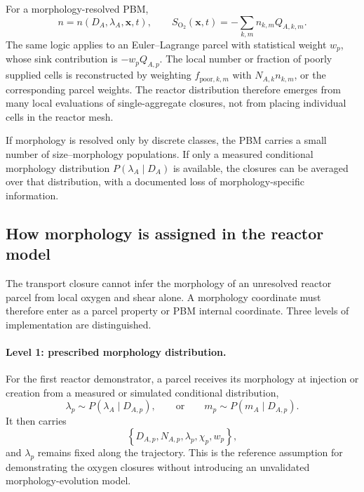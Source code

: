 \documentclass[11pt,a4paper]{article}
\newcommand{\Otwo}{\mathrm{O}_2}
\begin{document}
For a morphology-resolved PBM,
\begin{equation}
  n=n(D_A,\lambda_A,\boldsymbol{x},t),
  \qquad
  S_{\Otwo}(\boldsymbol{x},t)
  =-\sum_{k,m}n_{k,m}Q_{A,k,m}.
  \label{eq:pbm_sink}
\end{equation}
The same logic applies to an Euler--Lagrange parcel with statistical weight
\(w_p\), whose sink contribution is \(-w_pQ_{A,p}\). The local number or
fraction of poorly supplied cells is reconstructed by weighting
\(f_{\mathrm{poor},k,m}\) with \(N_{A,k}n_{k,m}\), or the corresponding parcel
weights. The reactor distribution therefore emerges from many local
evaluations of single-aggregate closures, not from placing individual cells in
the reactor mesh.

If morphology is resolved only by discrete classes, the PBM carries a small
number of size--morphology populations. If only a measured conditional
morphology distribution \(P(\lambda_A\mid D_A)\) is available, the closures can
be averaged over that distribution, with a documented loss of
morphology-specific information.

\subsection{How morphology is assigned in the reactor model}

The transport closure cannot infer the morphology of an unresolved reactor
parcel from local oxygen and shear alone. A morphology coordinate must
therefore enter as a parcel property or PBM internal coordinate. Three levels
of implementation are distinguished.

\paragraph{Level 1: prescribed morphology distribution.}
For the first reactor demonstrator, a parcel receives its morphology at
injection or creation from a measured or simulated conditional distribution,
\begin{equation}
  \lambda_p\sim P(\lambda_A\mid D_{A,p}),
  \qquad\text{or}\qquad
  m_p\sim P(m_A\mid D_{A,p}).
  \label{eq:morph_sampling}
\end{equation}
It then carries
\begin{equation}
  \left\{
  D_{A,p},N_{A,p},\lambda_p,\chi_p,w_p
  \right\},
  \label{eq:parcel_state}
\end{equation}
and \(\lambda_p\) remains fixed along the trajectory. This is the reference
assumption for demonstrating the oxygen closures without introducing an
unvalidated morphology-evolution model.
\end{document}

